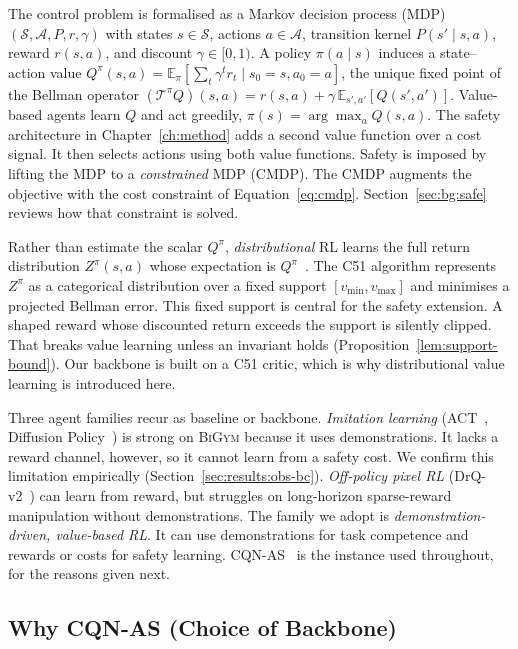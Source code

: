 \documentclass[11pt,a4paper]{report}
\newcommand{\bigym}{\textsc{BiGym}}
\newcommand{\cqnas}{CQN-AS}
\begin{document}
The control problem is formalised as a Markov decision process (MDP)
$(\mathcal{S}, \mathcal{A}, P, r, \gamma)$ with states $s \in
\mathcal{S}$, actions $a \in \mathcal{A}$, transition kernel
$P(s' \mid s, a)$, reward $r(s,a)$, and discount $\gamma \in [0,1)$. A
policy $\pi(a \mid s)$ induces a state--action value
$Q^{\pi}(s,a) = \mathbb{E}_{\pi}[\sum_t \gamma^t r_t \mid s_0 = s, a_0 =
a]$, the unique fixed point of the Bellman operator
$(\mathcal{T}^{\pi} Q)(s,a) = r(s,a) + \gamma\,
\mathbb{E}_{s',a'}[Q(s',a')]$. Value-based agents learn $Q$ and act
greedily, $\pi(s) = \arg\max_a Q(s,a)$. The safety architecture in
Chapter~\ref{ch:method} adds a second value function over a cost
signal. It then selects actions using both value functions. Safety is
imposed by lifting the MDP to a \emph{constrained} MDP (CMDP). The
CMDP augments the objective with the cost constraint of
Equation~\ref{eq:cmdp}. Section~\ref{sec:bg:safe} reviews how that
constraint is solved.

Rather than estimate the scalar $Q^{\pi}$, \emph{distributional} RL
learns the full return distribution $Z^{\pi}(s,a)$ whose expectation is
$Q^{\pi}$~\cite{bellemare2017c51}. The C51 algorithm represents
$Z^{\pi}$ as a categorical distribution over a fixed support
$[v_{\min}, v_{\max}]$ and minimises a projected Bellman error. This
fixed support is central for the safety extension. A shaped reward
whose discounted return exceeds the support is silently clipped. That
breaks value learning unless an invariant holds
(Proposition~\ref{lem:support-bound}). Our backbone is built on a C51
critic, which is why distributional value learning is introduced here.

Three agent families recur as baseline or backbone.
\emph{Imitation learning} (ACT~\cite{zhao2023act}, Diffusion
Policy~\cite{chi2023diffusion}) is strong on \bigym{} because it uses
demonstrations. It lacks a reward channel, however, so it cannot learn
from a safety cost. We confirm this limitation empirically
(Section~\ref{sec:results:obs-bc}). \emph{Off-policy pixel RL}
(DrQ-v2~\cite{yarats2021drqv2}) can learn from reward, but struggles
on long-horizon sparse-reward manipulation without demonstrations.
The family we adopt is \emph{demonstration-driven, value-based RL}.
It can use demonstrations for task competence and rewards or costs for
safety learning. \cqnas{}~\cite{seo2024cqnas} is the instance used
throughout, for the reasons given next.

\subsection{Why \cqnas{} (Choice of Backbone)}
\label{sec:bg:rl:cqnas}
\end{document}
